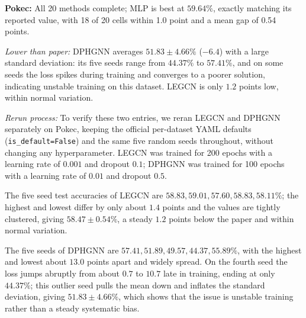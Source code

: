 \documentclass[11pt,a4paper]{article}
\begin{document}
\par\smallskip
\noindent\textbf{Pokec:} All 20 methods complete; MLP is best at $59.64\%$, exactly matching its reported value, with 18 of 20 cells within 1.0 point and a mean gap of 0.54 points.

\noindent\textit{Lower than paper:} DPHGNN averages $51.83\pm4.66\%$ ($-6.4$) with a large standard deviation: its five seeds range from $44.37\%$ to $57.41\%$, and on some seeds the loss spikes during training and converges to a poorer solution, indicating unstable training on this dataset. LEGCN is only $1.2$ points low, within normal variation.

\noindent\textit{Rerun process:} To verify these two entries, we reran LEGCN and DPHGNN separately on Pokec, keeping the official per-dataset YAML defaults (\texttt{is\_default=False}) and the same five random seeds throughout, without changing any hyperparameter. LEGCN was trained for 200 epochs with a learning rate of $0.001$ and dropout $0.1$; DPHGNN was trained for 100 epochs with a learning rate of $0.01$ and dropout $0.5$.

The five seed test accuracies of LEGCN are $58.83, 59.01, 57.60, 58.83, 58.11\%$; the highest and lowest differ by only about $1.4$ points and the values are tightly clustered, giving $58.47\pm0.54\%$, a steady $1.2$ points below the paper and within normal variation.

The five seeds of DPHGNN are $57.41, 51.89, 49.57, 44.37, 55.89\%$, with the highest and lowest about $13.0$ points apart and widely spread. On the fourth seed the loss jumps abruptly from about $0.7$ to $10.7$ late in training, ending at only $44.37\%$; this outlier seed pulls the mean down and inflates the standard deviation, giving $51.83\pm4.66\%$, which shows that the issue is unstable training rather than a steady systematic bias.
\end{document}
